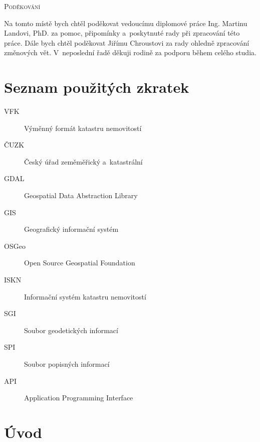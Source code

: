 \documentclass[a4paper,12pt,oneside]{book}
\begin{document}
\clearpage
\vspace*{\fill}

\noindent
\textsc{\Large Poděkování}

\vspace{12pt}
Na tomto místě bych chtěl poděkovat vedoucímu diplomové práce Ing. Martinu
Landovi, PhD. za pomoc,  připomínky a~poskytnuté rady při zpracování této práce. Dále bych chtěl poděkovat Jiřímu Chroustovi za rady ohledně zpracování změnových vět. V~neposlední řadě děkuji rodině za podporu během celého studia.
\vspace{2cm}

\clearpage
\chapter*{Seznam použitých zkratek}
\thispagestyle{empty}

\begin{description}
\item[VFK] Výměnný formát katastru nemovitostí
\item[ČUZK] Český úřad zeměměřický a~katastrální
\item[GDAL] Geospatial Data Abstraction Library
\item[GIS] Geografický informační systém
\item[OSGeo] Open Source Geospatial Foundation
\item[ISKN] Informační systém katastru nemovitostí
\item[SGI] Soubor geodetických informací
\item[SPI] Soubor popisných informací
\item[API] Application Programming Interface
\end{description}


\clearpage
\rhead{{\rightmark}}		%
\tableofcontents
\thispagestyle{empty}

\clearpage
\pagestyle{fancy}		%
\setcounter{page}{1}   	%
\chapter*{Úvod}
\end{document}
